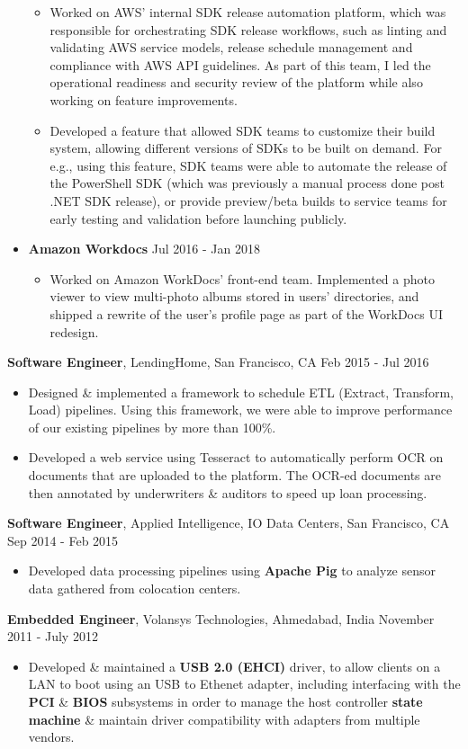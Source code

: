 \documentclass[10pt, letterpaper]{article}
\begin{document}
\begin{itemize}
\begin{itemize}[label=$\bullet$]
  \item Worked on AWS' internal SDK release automation platform, which was responsible for orchestrating SDK release workflows, such as linting and validating AWS service models, release schedule management and compliance with AWS API guidelines. As part of this team, I led the operational readiness and security review of the platform while also working on feature improvements.
  \item Developed a feature that allowed SDK teams to customize their build system, allowing different versions of SDKs to be built on demand. For e.g., using this feature, SDK teams were able to automate the release of the PowerShell SDK (which was previously a manual process done post .NET SDK release), or provide preview/beta builds to service teams for early testing and validation before launching publicly. 
  \end{itemize}
\item \textbf{Amazon Workdocs} \hfill Jul 2016 - Jan 2018
  \begin{itemize}[label=$\bullet$]
    \item Worked on Amazon WorkDocs' front-end team. Implemented a photo viewer to view multi-photo albums stored in users' directories, and shipped a rewrite of the user's profile page as part of the WorkDocs UI redesign.
  \end{itemize}
\end{itemize}
\textbf{Software Engineer}, LendingHome, San Francisco, CA \hfill Feb 2015 - Jul 2016
\begin{itemize}
\item Designed \& implemented a framework to schedule ETL (Extract, Transform, Load) pipelines. Using this framework, we were able to improve performance of our existing pipelines by more than 100\%.
\item Developed a web service using Tesseract to automatically perform OCR on documents that are uploaded to the platform. The OCR-ed documents are then annotated by underwriters \& auditors to speed up loan processing.
\end{itemize}
\textbf{Software Engineer}, Applied Intelligence, IO Data Centers, San Francisco, CA \hfill Sep 2014 - Feb 2015
\begin{itemize}
\item Developed data processing pipelines using \textbf{Apache Pig} to analyze sensor data gathered from colocation centers.
\end{itemize}
\textbf{Embedded Engineer}, Volansys Technologies, Ahmedabad, India \hfill November 2011 - July 2012
\begin{itemize}
\item Developed \& maintained a \textbf{USB 2.0 (EHCI)} driver, to allow clients on a LAN to boot using an USB to Ethenet adapter, including interfacing with the \textbf{PCI} \& \textbf{BIOS} subsystems in order to manage the host controller \textbf{state machine} \& maintain driver compatibility with adapters from multiple vendors. 
\end{itemize}
\end{document}
